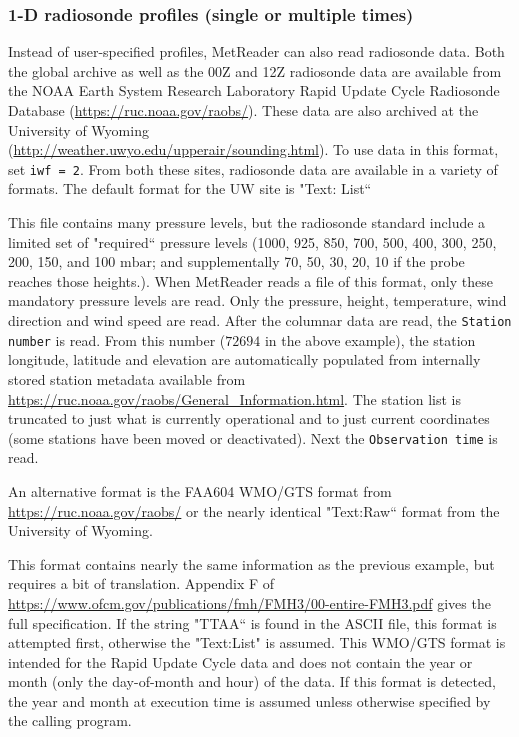 \documentclass[11pt]{article}   %
\begin{document}
\subsubsection{1-D radiosonde profiles (single or multiple times)}
Instead of user-specified profiles, MetReader can also read radiosonde data.
Both the global archive as well as the 00Z and 12Z radiosonde data are
available from the NOAA Earth System Research Laboratory Rapid Update Cycle
Radiosonde Database (\url{https://ruc.noaa.gov/raobs/}).  These data
are also archived at the University of Wyoming\\
(\url{http://weather.uwyo.edu/upperair/sounding.html}).
To use data in this format, set \texttt{iwf = 2}.
From both these sites, radiosonde data are available in a variety of formats.
The default format for the UW site is "Text: List``

\small  \normalsize

This file contains many pressure levels, but the radiosonde standard include
a limited set of "required`` pressure levels (1000, 925, 850, 700, 500,
400, 300, 250, 200, 150, and 100 $\mathrm{mbar}$; and supplementally 
70, 50, 30, 20, 10 if the probe reaches those heights.).
When MetReader reads a file of this format, only these mandatory pressure levels are
read.  Only the pressure, height, temperature, wind direction and wind speed are read.
After the columnar data are read, the \texttt{Station number} is read.  From this number
($72694$ in the above example), the station longitude, latitude and elevation are
automatically populated from internally stored station
metadata available from \url{https://ruc.noaa.gov/raobs/General\_Information.html}.  The
station list is truncated to just what is currently operational and to just current
coordinates (some stations have been moved or deactivated).
Next the \texttt{Observation time} is read.  

An alternative format is the FAA604 WMO/GTS format from \url{https://ruc.noaa.gov/raobs/}
or the nearly identical "Text:Raw`` format from the University of Wyoming.

\small  \normalsize

This format contains nearly the same information as the previous example, but 
requires a bit of translation.
Appendix F of\\
\url{https://www.ofcm.gov/publications/fmh/FMH3/00-entire-FMH3.pdf}
gives the full specification.
If the string "TTAA`` is found
in the ASCII file, this format is attempted first, otherwise the "Text:List" is
assumed.  This WMO/GTS format is intended for the Rapid Update Cycle data and
does not contain the year or month (only the day-of-month and hour) of the data.
If this format is detected, the year and month at
execution time is assumed unless otherwise
specified by the calling program.
\end{document}
